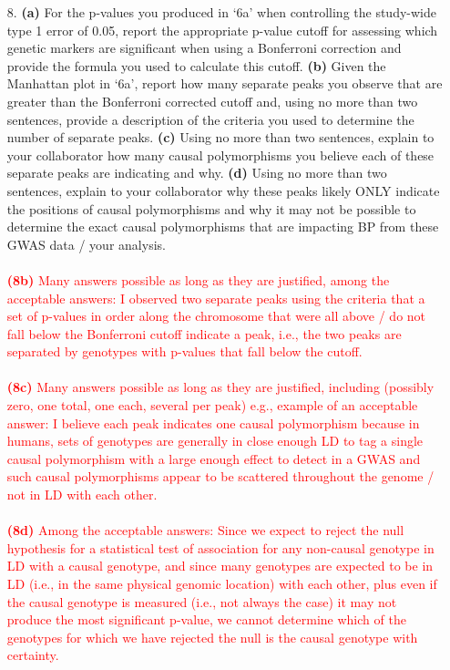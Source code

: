 \documentclass[letterpaper, 11pt]{article}
\begin{document}
\begin{itemize}
\item[8.] \textbf{(a)} For the p-values you produced in `6a' when controlling the study-wide type 1 error of 0.05, report the appropriate p-value cutoff for assessing which genetic markers are significant when using a Bonferroni correction and provide the formula you used to calculate this cutoff.  \textbf{(b)} Given the Manhattan plot in `6a', report how many separate peaks you observe that are greater than the Bonferroni corrected cutoff and, using no more than two sentences, provide a description of the criteria you used to determine the number of separate peaks.  \textbf{(c)}  Using no more than two sentences, explain to your collaborator how many causal polymorphisms you believe each of these separate peaks are indicating and why.  \textbf{(d)}  Using no more than two sentences, explain to your collaborator why these peaks likely ONLY indicate the positions of causal polymorphisms and why it may not be possible to determine the exact causal polymorphisms that are impacting BP from these GWAS data / your analysis.
\\
\\
\textcolor{red}{ 
\textbf{(8b)} Many answers possible as long as they are justified, among the acceptable answers: I observed two separate peaks using the criteria that a set of p-values in order along the chromosome that were all above / do not fall below the Bonferroni cutoff indicate a peak, i.e., the two peaks are separated by genotypes with p-values that fall below the cutoff.
\\
\\
\textbf{(8c)} Many answers possible as long as they are justified, including (possibly zero, one total, one each, several per peak) e.g., example of an acceptable answer: I believe each peak indicates one causal polymorphism because in humans, sets of genotypes are generally in close enough LD to tag a single causal polymorphism with a large enough effect to detect in a GWAS and such causal polymorphisms appear to be scattered throughout the genome / not in LD with each other.
\\
\\
\textbf{(8d)} Among the acceptable answers: Since we expect to reject the null hypothesis for a statistical test of association for any non-causal genotype in LD with a causal genotype, and since many genotypes are expected to be in LD (i.e., in the same physical genomic location) with each other, plus even if the causal genotype is measured (i.e., not always the case) it may not produce the most significant p-value, we cannot determine which of the genotypes for which we have rejected the null is the causal genotype with certainty. 
} 



\end{itemize}
\end{document}
